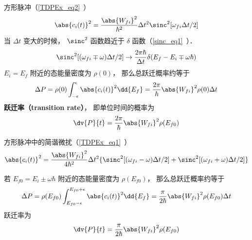 

方形脉冲（\autoref{TDPEx_eq2}~）
\begin{equation}
\abs{c_i(t)}^2 = \frac{\abs{W_{fi}}^2}{\hbar^2} \Delta t^2 \sinc^2[\omega_{fi}\Delta t/2]
\end{equation}
当 $\Delta t$ 变大的时候， $\sinc^2$ 函数趋近于 $\delta$ 函数（\autoref{sinc_eq1}~）．
\begin{equation}
\sinc^2[(\omega_{fi}\mp\omega)\Delta t/2] \to \frac{2\pi\hbar}{\Delta t}\delta(E_f - E_i \mp \omega\hbar)
\end{equation}
$E_i=E_f$ 附近的态能量密度为 $\rho(0)$， 那么总跃迁概率约等于
\begin{equation}
\Delta P = \rho(0)\int_{-\epsilon}^{\epsilon}\abs{c_i(t)}^2 \dd{E_f}
= \frac{2\pi}{\hbar} \abs{W_{fi}}^2\rho(0)\Delta t
\end{equation}
\textbf{跃迁率（transition rate）}， 即单位时间的概率为
\begin{equation}
\dv{P}{t} = \frac{2\pi}{\hbar} \abs{W_{fi}}^2\rho(E_{f0})
\end{equation}

方形脉冲中的简谐微扰（\autoref{TDPEx_eq1}~）
\begin{equation}
\abs{c_i(t)}^2 = \frac{\abs{W_{fi}}^2}{4\hbar^2} \Delta t^2 \{\sinc^2[(\omega_{fi}-\omega)\Delta t/2] + \sinc^2[(\omega_{fi}+\omega)\Delta t/2]\}
\end{equation}

若 $E_{f0} = E_i \pm \omega\hbar$ 附近的态能量密度为 $\rho(E_{f0})$， 那么总跃迁概率约等于
\begin{equation}
\Delta P = \rho(E_{f0})\int_{E_{f0}-\epsilon}^{E_{f0}+\epsilon}\abs{c_i(t)}^2 \dd{E_f}
= \frac{\pi}{2\hbar} \abs{W_{fi}}^2\rho(E_{f0})\Delta t
\end{equation}
跃迁率为
\begin{equation}
\dv{P}{t} = \frac{\pi}{2\hbar} \abs{W_{fi}}^2\rho(E_{f0})
\end{equation}

